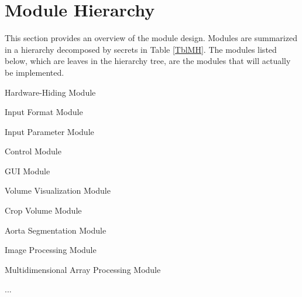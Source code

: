\documentclass[12pt, titlepage]{article}
\newcounter{mnum}
\newcommand{\mthemnum}{M\themnum}
\begin{document}
\section{Module Hierarchy} \label{SecMH}

This section provides an overview of the module design. Modules are summarized
in a hierarchy decomposed by secrets in Table \ref{TblMH}. The modules listed
below, which are leaves in the hierarchy tree, are the modules that will
actually be implemented.

\begin{description}
\item [ \mthemnum \label{mHH}:] Hardware-Hiding Module
\item [ \mthemnum \label{mInput}:] Input Format Module
\item [ \mthemnum \label{mParams}:] Input Parameter Module
\item [ \mthemnum \label{mControl}:] Control Module
\item [ \mthemnum \label{mGUI}:] GUI Module
\item [ \mthemnum \label{mVV}:] Volume Visualization Module
\item [ \mthemnum \label{mROI}:] Crop Volume Module
\item [ \mthemnum \label{mAortaSeg}:] Aorta Segmentation Module
\item [ \mthemnum \label{mIP}:] Image Processing Module
\item [ \mthemnum \label{mNDAP}:] Multidimensional Array Processing Module
\item ...
\end{description}
\end{document}
